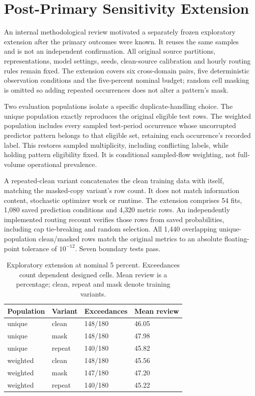 \documentclass[manuscript,screen,nonacm]{acmart}
\begin{document}
\section{Post-Primary Sensitivity Extension}
An internal methodological review motivated a separately frozen exploratory extension after the primary outcomes were known. It reuses the same samples and is not an independent confirmation. All original source partitions, representations, model settings, seeds, clean-source calibration and hourly routing rules remain fixed. The extension covers six cross-domain pairs, five deterministic observation conditions and the five-percent nominal budget; random cell masking is omitted so adding repeated occurrences does not alter a pattern's mask.

Two evaluation populations isolate a specific duplicate-handling choice. The unique population exactly reproduces the original eligible test rows. The weighted population includes every sampled test-period occurrence whose uncorrupted predictor pattern belongs to that eligible set, retaining each occurrence's recorded label. This restores sampled multiplicity, including conflicting labels, while holding pattern eligibility fixed. It is conditional sampled-flow weighting, not full-volume operational prevalence.

A repeated-clean variant concatenates the clean training data with itself, matching the masked-copy variant's row count. It does not match information content, stochastic optimizer work or runtime. The extension comprises 54 fits, 1,080 saved prediction conditions and 4,320 metric rows. An independently implemented routing recount verifies those rows from saved probabilities, including cap tie-breaking and random selection. All 1,440 overlapping unique-population clean/masked rows match the original metrics to an absolute floating-point tolerance of $10^{-12}$. Seven boundary tests pass.

\begin{table}[t]
\centering
\caption{Exploratory extension at nominal 5 percent. Exceedances count dependent designed cells. Mean review is a percentage; clean, repeat and mask denote training variants.}
\begin{tabular}{llll}
\toprule
Population & Variant & Exceedances & Mean review \\
\midrule
unique & clean & 148/180 & 46.05 \\
unique & mask & 148/180 & 47.98 \\
unique & repeat & 140/180 & 45.82 \\
weighted & clean & 148/180 & 45.56 \\
weighted & mask & 147/180 & 47.20 \\
weighted & repeat & 140/180 & 45.22 \\
\bottomrule
\end{tabular}
\end{table}
\end{document}
